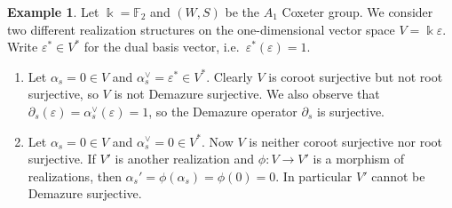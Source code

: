 \documentclass{amsart}
\theoremstyle{plain}
\theoremstyle{definition}
\newtheorem{exam}[thm]{Example}
\theoremstyle{remark}
\newtheorem{rem}[thm]{Remark}
\numberwithin{equation}{section}
\DeclareMathOperator{\Sym}{Sym}
\begin{document}
\begin{exam}
Let $\Bbbk=\mathbb{F}_2$ and $(W,S)$ be the $A_1$ Coxeter group. 
We consider two different realization structures on the one-dimensional vector space $V=\Bbbk \varepsilon$. 
Write $\varepsilon^\ast \in V^\ast$ for the dual basis vector, i.e.~$\varepsilon^\ast(\varepsilon)=1$.
\begin{enumerate}
\item Let $\alpha_s=0 \in V$ and $\alpha_s^\vee=\varepsilon^\ast \in V^\ast$. 
Clearly $V$ is coroot surjective but not root surjective, so $V$ is not Demazure surjective.
We also observe that $\partial_s(\varepsilon)=\alpha_s^\vee(\varepsilon)=1$, so the Demazure operator $\partial_s$ is surjective.

\item Let $\alpha_s=0 \in V$ and $\alpha_s^\vee=0 \in V^\ast$. 
Now $V$ is neither coroot surjective nor root surjective. 
If $V'$ is another realization and $\phi:V \rightarrow V'$ is a morphism of realizations, then $\alpha_s'=\phi(\alpha_s)=\phi(0)=0$. 
In particular $V'$ cannot be Demazure surjective. 
\end{enumerate}
\end{exam}


%
%
%
\end{document}
